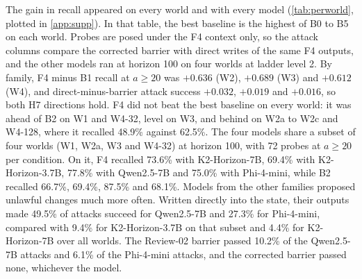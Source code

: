 \documentclass[letterpaper,journal,onecolumn]{IEEEtran}
\begin{document}
The gain in recall appeared on every world and with every model (\cref{tab:perworld}, plotted in \cref{app:supp}). In that table, the best baseline is the highest of B0 to B5 on each world. Probes are posed under the F4 context only, so the attack columns compare the corrected barrier with direct writes of the same F4 outputs, and the other models ran at horizon 100 on four worlds at ladder level 2. By family, F4 minus B1 recall at $a\ge20$ was $+0.636$ (W2), $+0.689$ (W3) and $+0.612$ (W4), and direct-minus-barrier attack success $+0.032$, $+0.019$ and $+0.016$, so both H7 directions hold. F4 did not beat the best baseline on every world: it was ahead of B2 on W1 and W4-32, level on W3, and behind on W2a to W2c and W4-128, where it recalled 48.9\% against 62.5\%. The four models share a subset of four worlds (W1, W2a, W3 and W4-32) at horizon 100, with 72 probes at $a\ge20$ per condition. On it, F4 recalled 73.6\% with K2-Horizon-7B, 69.4\% with K2-Horizon-3.7B, 77.8\% with Qwen2.5-7B and 75.0\% with Phi-4-mini, while B2 recalled 66.7\%, 69.4\%, 87.5\% and 68.1\%. Models from the other families proposed unlawful changes much more often. Written directly into the state, their outputs made 49.5\% of attacks succeed for Qwen2.5-7B and 27.3\% for Phi-4-mini, compared with 9.4\% for K2-Horizon-3.7B on that subset and 4.4\% for K2-Horizon-7B over all worlds. The Review-02 barrier passed 10.2\% of the Qwen2.5-7B attacks and 6.1\% of the Phi-4-mini attacks, and the corrected barrier passed none, whichever the model.
\end{document}
